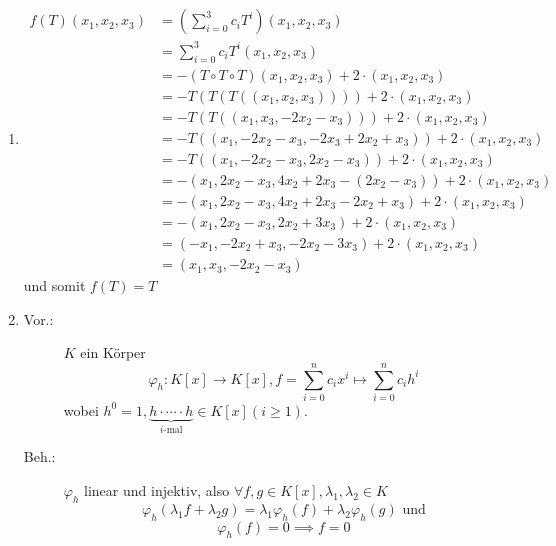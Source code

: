 \documentclass[sectionformat = aufgabe]{gadsescript}
\begin{document}
\maketitle
\setcounter{section}{4}
\subsection{}
\begin{enumerate}[label=(\alph*)]
	\item 
		\begin{align*}
			f(T) (x_1, x_2, x_3) &= \left( \sum_{i=0}^{3} c_i T^i \right) (x_1, x_2, x_3) \\
			~ &= \sum_{i=0}^{3} c_i T^i (x_1, x_2, x_3) \\
			~ &= - (T \circ T \circ T) (x_1, x_2, x_3) + 2 \cdot (x_1, x_2, x_3) \\
			~ &= - T(T(T((x_1, x_2, x_3)))) + 2 \cdot (x_1, x_2, x_3) \\
			~ &= - T(T((x_1, x_3, -2x_2 - x_3))) + 2 \cdot (x_1, x_2, x_3) \\
			~ &= - T((x_1, -2x_2 - x_3, -2x_3 + 2x_2 + x_3)) + 2 \cdot (x_1, x_2, x_3) \\
			~ &= - T((x_1, -2x_2 - x_3, 2x_2 - x_3)) + 2 \cdot (x_1, x_2, x_3) \\
			~ &= - (x_1, 2x_2 - x_3, 4x_2 + 2x_3 - (2x_2 - x_3)) + 2 \cdot (x_1, x_2, x_3) \\
			~ &= - (x_1, 2x_2 - x_3, 4x_2 + 2x_3 - 2x_2 + x_3) + 2 \cdot (x_1, x_2, x_3) \\
			~ &= - (x_1, 2x_2 - x_3, 2x_2 + 3x_3) + 2 \cdot (x_1, x_2, x_3) \\
			~ &= (- x_1, - 2x_2 + x_3, -2x_2 - 3x_3) + 2 \cdot (x_1, x_2, x_3) \\
			~ &= (x_1, x_3, -2x_2 - x_3)
		\end{align*}
		und somit $ f(T) = T $
	\item 
		\begin{description}
			\item[Vor.:] $ K $ ein Körper
				\[
					\varphi_h : K[x] \to K[x], f = \sum_{i=0}^{n} c_i x^i \mapsto \sum_{i=0}^{n} c_i h^i
				\]
				wobei $ h^0 = 1, \underbrace{h \cdot \dotsb \cdot h}_{i\text{-mal} } \in K[x] (i \geq 1) $.
			\item[Beh.:] $ \varphi_h $ linear und injektiv, also $ \forall f, g \in K[x], \lambda_1, \lambda_2 \in K $
				\[
					\varphi_h (\lambda_1 f + \lambda_2 g) = \lambda_1 \varphi_h (f) + \lambda_2 \varphi_h(g) \text{ und} 
				\]
				\[
					\varphi_h(f) = 0 \implies f = 0
\]
\end{description}
\end{enumerate}
\end{document}
